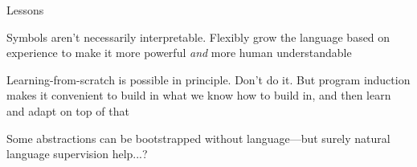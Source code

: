 \documentclass{beamer}
\newcommand{\1}[1]{\mathds{1}\left[#1\right]}
\begin{document}
\begin{frame}{Lessons}

  Symbols aren't necessarily interpretable. Flexibly grow the language based on experience to make it more powerful \emph{and} more human understandable

  \vspace{1cm}

  Learning-from-scratch is possible in principle. Don't do it. But program induction makes it convenient to build in what we know how to build in, and then learn and adapt on top of that

  \vspace{1cm}

  Some abstractions can be bootstrapped without language---but surely natural language supervision help...?
\end{frame}

\end{document}
